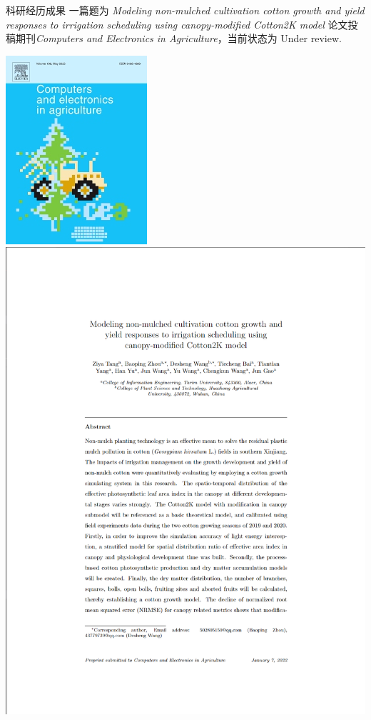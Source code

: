 \documentclass[xcolor=svgnames, t, aspectratio=169]{ctexbeamer}
\begin{document}
\begin{frame}{科研经历}{成果}
  一篇题为 \textit{Modeling non-mulched cultivation cotton growth and yield responses to irrigation scheduling using canopy-modified Cotton2K model} 论文投稿期刊\textit{Computers and Electronics in Agriculture}，当前状态为 Under review.
  \begin{center}
    \includegraphics[scale=1.5]{compag.jpg}
    \includegraphics[scale=0.18,trim=1 0 0 1, clip]{submission.png}
  \end{center}
\end{frame}
\end{document}
